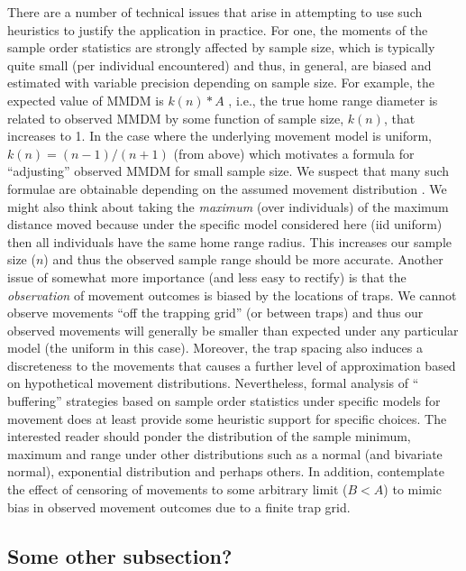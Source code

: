 There are a number of technical issues that arise in attempting to use
such heuristics to justify the application in practice. For one, the
moments of the sample order statistics are strongly affected by sample
size, which is typically quite small (per individual encountered) and
thus, in general, are biased and estimated with variable precision
depending on sample size. For example, the expected value of MMDM is
$k(n)*A$ , i.e., the true home range diameter is related to observed
MMDM by some function of sample size, $k(n)$, that increases to 1. In
the case where the underlying movement model is uniform, $k(n) =
(n-1)/(n+1)$ (from above) which motivates a formula for ``adjusting''
observed MMDM for small sample size. We suspect that many such
formulae are obtainable depending on the assumed movement distribution
\citep[e.g., formula 6.16 in][]{obrien:2011}. We might also think about taking
the {\it maximum} (over individuals) of the maximum distance moved
because under the specific model considered here (iid uniform) then
all individuals have the same home range radius. This increases our
sample size ($n$) and thus the observed sample range should be more
accurate. Another issue of somewhat more importance (and less easy to
rectify) is that the {\it observation} of movement outcomes is biased
by the locations of traps. We cannot observe movements ``off the
trapping grid'' (or between traps) and thus our observed movements
will generally be smaller than expected under any particular model
(the uniform in this case). Moreover, the trap spacing also induces a
discreteness to the movements that causes a further level of
approximation based on hypothetical movement
distributions. Nevertheless, formal analysis of `` buffering''
strategies based on sample order statistics under specific models for
movement does at least provide some heuristic support for specific
choices.  The interested reader should ponder the distribution of the
sample minimum, maximum and range under other distributions such as a
normal (and bivariate normal), exponential distribution and perhaps
others. In addition, contemplate the effect of censoring of movements
to some arbitrary limit ($B<A$) to mimic bias in observed movement
outcomes due to a finite trap grid.

\subsection{Some other subsection?}

